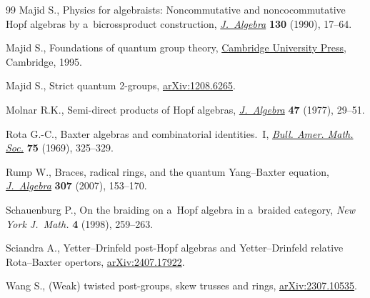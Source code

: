 \begin{thebibliography}{99}
Majid S., Physics for algebraists: {N}oncommutative and noncocommutative {H}opf
 algebras by a~bicrossproduct construction, \href{https://doi.org/10.1016/0021-8693(90)90099-A}{\textit{J.~Algebra}} \textbf{130}
 (1990), 17--64.

Majid S., Foundations of quantum group theory, \href{https://doi.org/10.1017/CBO9780511613104}{Cambridge University Press},
 Cambridge, 1995.

Majid S., Strict quantum 2-groups, \href{https://arxiv.org/abs/1208.6265}{arXiv:1208.6265}.

Molnar R.K., Semi-direct products of {H}opf algebras, \href{https://doi.org/10.1016/0021-8693(77)90208-3}{\textit{J.~Algebra}}
 \textbf{47} (1977), 29--51.

Rota G.-C., Baxter algebras and combinatorial identities.~{I}, \href{https://doi.org/10.1090/S0002-9904-1969-12156-7}{\textit{Bull.
 Amer. Math. Soc.}} \textbf{75} (1969), 325--329.

Rump W., Braces, radical rings, and the quantum {Y}ang--{B}axter equation,
 \href{https://doi.org/10.1016/j.jalgebra.2006.03.040}{\textit{J.~Algebra}} \textbf{307} (2007), 153--170.

Schauenburg P., On the braiding on a~{H}opf algebra in a~braided category,
 \textit{New York J.~Math.} \textbf{4} (1998), 259--263.

Sciandra A., {Y}etter--{D}rinfeld post-Hopf algebras and {Y}etter--{D}rinfeld
 relative {R}ota--{B}axter opertors, \href{https://arxiv.org/abs/2407.17922}{arXiv:2407.17922}.

Wang S., (Weak) twisted post-groups, skew trusses and rings,
 \href{https://arxiv.org/abs/2307.10535}{arXiv:2307.10535}.

\end{thebibliography}
